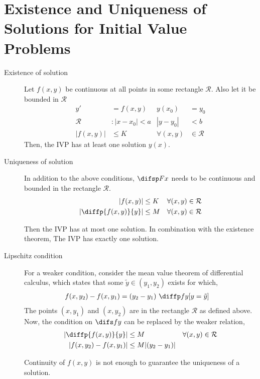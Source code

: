 \section{Existence and Uniqueness of Solutions for Initial Value Problems}

\begin{description}
    \item[Existence of solution] Let $ f(x, y) $ be continuous at all points in some rectangle
        $ \mathcal{R} $. Also let it be bounded in $ \mathcal{R} $
        \begin{align}
            y'          & = f(x, y)         & y(x_{0})           & = y_{0}         \\
            \mathcal{R} & : |x - x_{0}| < a & |y - y_{0}|        & < b             \\
            |f(x, y)|   & \leq K            & \forall     (x, y) & \in \mathcal{R}
        \end{align}
        Then, the IVP has at least one solution $ y(x) $.

    \item[Uniqueness of solution] In addition to the above conditions, $ \difsp Fx $ needs
        to be continuous and bounded in the rectangle $ \mathcal{R} $.
        \begin{align}
            |f(x, y)|                         & \leq K & \forall     (x, y) & \in \mathcal{R} \\
            \left| \diffp{f(x, y)}{y} \right| & \leq M & \forall     (x, y) & \in \mathcal{R}
        \end{align}

        Then the IVP has at most one solution. In combination with the existence theorem,
        The IVP has exactly one solution.
    \item[Lipschitz condition] For a weaker condition, consider the mean value theorem
        of differential calculus, which states that some $ \tilde{y} \in (y_{1}, y_{2})$
        exists for which,
        \begin{align}
            f(x, y_{2}) - f(x, y_{1}) & = (y_{2} - y_{1})\ \diffp fy[y = \tilde{y}]
        \end{align}
        The points $ (x, y_{1}) $ and $ (x, y_{2}) $ are in the rectangle $ \mathcal{R} $ as
        defined above. Now, the condition on $ \difs fy $ can be replaced by the weaker relation,
        \begin{align}
            \left| \diffp{f(x, y)}{y} \right|        & \leq M                   & \forall     (x, y) & \in \mathcal{R} \\
            \left| f(x, y_{2}) - f(x, y_{1}) \right| & \leq M |(y_{2} - y_{1})|
        \end{align}

        Continuity of $ f(x, y) $ is not enough to guarantee the uniqueness of a solution.
\end{description}
